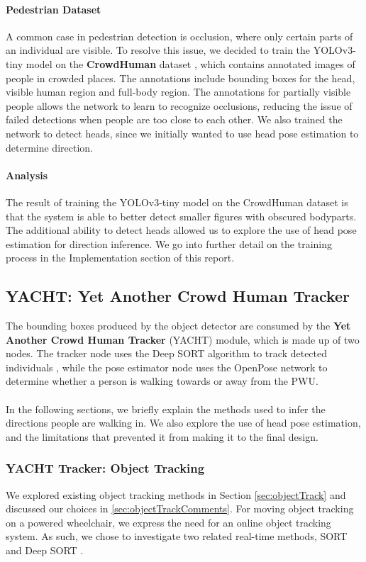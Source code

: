 \paragraph{Pedestrian Dataset} A common case in pedestrian detection is occlusion, where only certain parts of an individual are visible.  To resolve this issue, we decided to train the YOLOv3-tiny model on the \textbf{CrowdHuman} dataset \cite{Shao}, which contains annotated images of people in crowded places. The annotations include bounding boxes for the head, visible human region and full-body region. The annotations for partially visible people allows the network to learn to recognize occlusions, reducing the issue of failed detections when people are too close to each other. We also trained the network to detect heads, since we initially wanted to use head pose estimation to determine direction.

\paragraph{Analysis}
The result of training the YOLOv3-tiny model on the CrowdHuman dataset is that the system is able to better detect smaller figures with obscured bodyparts. The additional ability to detect heads allowed us to explore the use of head pose estimation for direction inference. We go into further detail on the training process in the Implementation section of this report.

\subsection{YACHT: Yet Another Crowd Human Tracker}
The bounding boxes produced by the object detector are consumed by the \textbf{Yet Another Crowd Human Tracker} (YACHT) module, which is made up of two nodes. The tracker node uses the Deep SORT algorithm to track detected individuals \cite{Wojke2018}, while the pose estimator node uses the OpenPose \cite{Cao2017} network to determine whether a person is walking towards or away from the PWU.

\paragraph{}In the following sections, we briefly explain the  methods used to infer the directions people are walking in. We also explore the use of head pose estimation, and the limitations that prevented it from making it to the final design.

\subsubsection{YACHT Tracker: Object Tracking} \label{sec:YACHT}
We explored existing object tracking methods in Section \ref{sec:objectTrack} and discussed our choices in \ref{sec:objectTrackComments}. For moving object tracking on a powered wheelchair, we express the need for an online object tracking system. As such, we chose to investigate two related real-time methods, SORT \cite{Bewley2016} and Deep SORT \cite{Wojke2018}.

